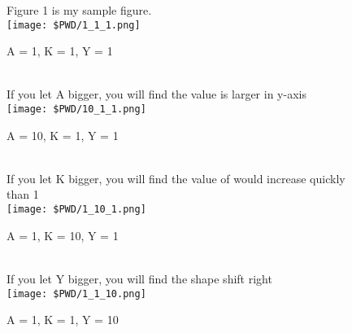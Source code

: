 \documentclass{article}
\begin{document}
  \begin{figure}[hb]
    Figure 1 is my sample figure.\\
    \centering\texttt{[image: \$PWD/1\_1\_1.png]}
    \caption{A = 1, K = 1, Y = 1}\label{fig:test}
      
    \ \\If you let A bigger, you will find the value is larger in y-axis\\
    \centering\texttt{[image: \$PWD/10\_1\_1.png]}
    \caption{A = 10, K = 1, Y = 1}\label{fig:test}
    

    \ \\If you let K bigger, you will find the value of would increase quickly than 1\\
    \centering\texttt{[image: \$PWD/1\_10\_1.png]}
    \caption{A = 1, K = 10, Y = 1}\label{fig:test}
    
    \ \\If you let Y bigger, you will find the shape shift right\\
    \centering\texttt{[image: \$PWD/1\_1\_10.png]}
    \caption{A = 1, K = 1, Y = 10}\label{fig:test}
  \end{figure}
\end{document}
